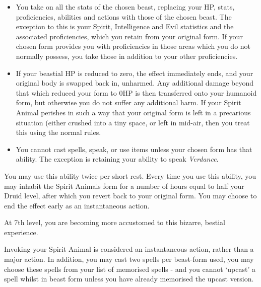 {\begin{itemize}[itemsep = 0cm]
\begin{itemize}[itemsep = 0cm]
\begin{center}
						\begin{rndtable}{p{1.2cm} c p{4.3cm} }
							\bf Level	&	\bf Rating	&	\bf	Example \\
						\end{rndtable}
					\end{center}
			\end{itemize}
		\item You take on all the stats of the chosen beast, replacing your HP, stats, proficiencies, abilities and actions with those of the chosen beast. The exception to this is your Spirit, Intelligence and Evil statistics and the associated proficiencies, which you retain from your original form. If your chosen form provides you with proficiencies in those areas which you do not normally possess, you take those in addition to your other proficiencies. 
		\item If your beastial HP is reduced to zero, the effect immediately ends, and your original body is swapped back in, unharmed. Any additional damage beyond that which reduced your form to 0HP is then transferred onto your humanoid form, but otherwise you do not suffer any additional harm. If your Spirit Animal perishes in such a way that your original form is left in a precarious situation (either crushed into a tiny space, or left in mid-air, then you treat this using the normal rules. 
		\item You cannot cast spells, speak, or use items unless your chosen form has that ability. The exception is retaining your ability to speak {\it Verdance}.
	\end{itemize}
	
	You may use this ability twice per short rest. Every time you use this ability, you may inhabit the Spirit Animal\apos{}s form for a number of hours equal to half your Druid level, after which you revert back to your original form. You may choose to end the effect early as an instantaneous action.
}
{
	At 7th level, you are becoming more accustomed to this bizarre, bestial experience. 
	
	Invoking your Spirit Animal is considered an instantaneous action, rather than a major action. In addition, you may cast two spells per beast-form used, you may choose these spells from your list of memorised spells - and you cannot `upcast' a spell whilst in beast form unless you have already memorised the upcast version. 
}


